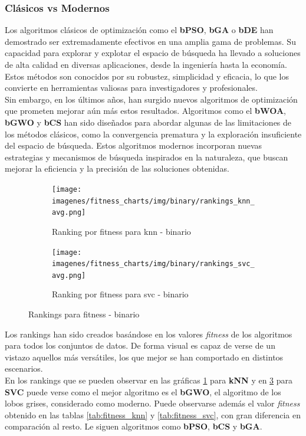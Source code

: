 \subsubsection{Clásicos vs Modernos}
Los algoritmos clásicos de optimización como el \textbf{bPSO}, \textbf{bGA} o \textbf{bDE} han demostrado ser extremadamente efectivos en una amplia gama de problemas. Su capacidad para explorar y explotar el espacio de búsqueda ha llevado a soluciones de alta calidad en diversas aplicaciones, desde la ingeniería hasta la economía. Estos métodos son conocidos por su robustez, simplicidad y eficacia, lo que los convierte en herramientas valiosas para investigadores y profesionales.\\[6pt]
Sin embargo, en los últimos años, han surgido nuevos algoritmos de optimización que prometen mejorar aún más estos resultados. Algoritmos como el \textbf{bWOA}, \textbf{bGWO} y \textbf{bCS} han sido diseñados para abordar algunas de las limitaciones de los métodos clásicos, como la convergencia prematura y la exploración insuficiente del espacio de búsqueda. Estos algoritmos modernos incorporan nuevas estrategias y mecanismos de búsqueda inspirados en la naturaleza, que buscan mejorar la eficiencia y la precisión de las soluciones obtenidas.\\[6pt]

\begin{figure}[htb]
    \centering
    \begin{subfigure}[b]{1\textwidth}
        \texttt{[image: imagenes/fitness\_charts/img/binary/rankings\_knn\_avg.png]}
        \caption{Ranking por fitness para knn - binario}
        \label{fig:ranking_knn}
    \end{subfigure}
    \begin{subfigure}[b]{1\textwidth}
        \texttt{[image: imagenes/fitness\_charts/img/binary/rankings\_svc\_avg.png]}
        \caption{Ranking por fitness para svc - binario}
        \label{fig:ranking_svc}
    \end{subfigure}
    \caption{Rankings para fitness - binario}
\end{figure}

Los rankings han sido creados basándose en los valores \textit{fitness} de los algoritmos para todos los conjuntos de datos. De forma visual es capaz de verse de un vistazo aquellos más versátiles, los que mejor se han comportado en distintos escenarios.\\[6pt]

En los rankings que se pueden observar en las gráficas \ref{fig:ranking_knn} para \textbf{kNN} y en \ref{fig:ranking_svc} para \textbf{SVC} puede verse como el mejor algoritmo es el \textbf{bGWO}, el algoritmo de los lobos grises, considerado como moderno. Puede observarse además el valor \textit{fitness} obtenido en las tablas \ref{tab:fitness_knn} y \ref{tab:fitness_svc}, con gran diferencia en comparación al resto. Le siguen algoritmos como \textbf{bPSO}, \textbf{bCS} y \textbf{bGA}.\\[6pt]

